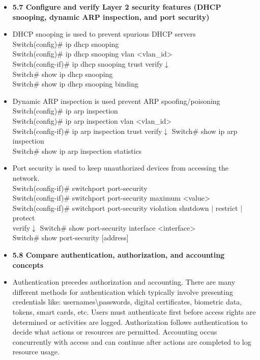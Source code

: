 \documentclass{article}
\begin{document}
\begin{itemize}
  \item \textbf{5.7 Configure and verify Layer 2 security features (DHCP snooping, dynamic ARP inspection, and port security)}
  	\item[] DHCP snooping is used to prevent spurious DHCP servers\\
  		Switch(config)\# ip dhcp snooping\\
		Switch(config)\# ip dhcp snooping vlan \textless vlan\_id\textgreater\\
		Switch(config-if)\# ip dhcp snooping trust
		verify$\downarrow$\\
		Switch\# show ip dhcp snooping\\
		Switch\# show ip dhcp snooping binding
  	\item[] Dynamic ARP inspection is used prevent ARP spoofing/poisoning\\
  		Switch(config)\# ip arp inspection\\
		Switch(config)\# ip arp inspection vlan \textless vlan\_id\textgreater\\
		Switch(config-if)\# ip arp inspection trust
		verify$\downarrow$
		Switch\# show ip arp inspection\\
		Switch\# show ip arp inspection statistics
  	\item[] Port security is used to keep unauthorized devices from accessing the network.\\
  		Switch(config-if)\# switchport port-security\\
		Switch(config-if)\# switchport port-security maximum \textless value\textgreater\\
		Switch(config-if)\# switchport port-security violation {shutdown $\mid$ restrict $\mid$ protect}\\
		verify$\downarrow$
		Switch\# show port-security interface \textless interface\textgreater\\
		Switch\# show port-security [address]
  
  \item \textbf{5.8 Compare authentication, authorization, and accounting concepts}
  	\item[] Authentication precedes authorization and accounting. There are many different methods for authentication which typically involve presenting credentials like: usernames\textbackslash{}passwords, digital certificates, biometric data, tokens, smart cards, etc. Users must authenticate first before access rights are determined or activities are logged. Authorization follows authentication to decide what actions or resources are permitted. Accounting occus concurrently with access and can continue after actions are completed to log resource usage.
  

\end{itemize}
\end{document}
